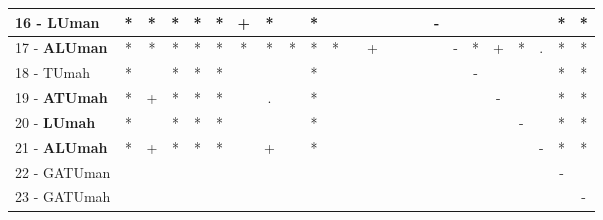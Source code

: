\begin{table}[h]
\begin{center}
\begin{tabular}{lcc|cc|cc|cc|cc|cc|cc|cc|cc|cc|cc|c}
16 - \textbf{LUman}	& * & * & * & * & * & + & * &   & * &   &   &   &   &   &   & - &   &   &   &   &   & * & * \\ \hline
17 - \textbf{ALUman}	& * & * & * & * & * & * & * & * & * & * &   & + &   &   &   &   & - & * & + & * & . & * & * \\
18 - TUmah	& * &   & * & * & * &   &   &   & * &   &   &   &   &   &   &   &   & - &   &   &   & * & * \\ \hline
19 - \textbf{ATUmah}	& * & + & * & * & * &   & . &   & * &   &   &   &   &   &   &   &   &   & - &   &   & * & * \\
20 - \textbf{LUmah}	& * &   & * & * & * &   &   &   & * &   &   &   &   &   &   &   &   &   &   & - &   & * & * \\ \hline
21 - \textbf{ALUmah}	& * & + & * & * & * &   & + &   & * &   &   &   &   &   &   &   &   &   &   &   & - & * & * \\
22 - GATUman	&   &   &   &   &   &   &   &   &   &   &   &   &   &   &   &   &   &   &   &   &   & - &   \\ \hline
23 - GATUmah	&   &   &   &   &   &   &   &   &   &   &   &   &   &   &   &   &   &   &   &   &   &   & - \\\end{tabular}
\label{stratsALCKappaFriedC4.5}
\end{center}
\end{table}